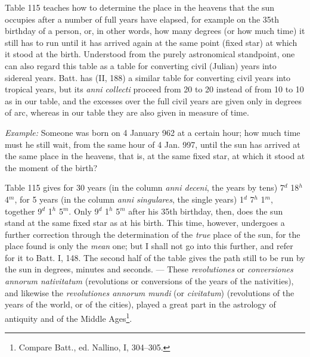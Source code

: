 \documentclass[11pt]{article}
\newcommand{\Pg}[1]{\marginpar{\footnotesize\color{gray}#1}}
\begin{document}
\par Table 115 teaches how to determine the place in the heavens that the sun occupies after a number of full years have elapsed, for example on the 35th birthday of a person, or, in other words, how many degrees (or how much time) it still has to run until it has arrived again at the same point (fixed star) at which it stood at the birth. Understood from the purely astronomical standpoint, one can also regard this table as a table for converting civil (Julian) years into sidereal years. Batt. has (II, 188) a similar table for converting civil years into tropical years, but its \emph{anni collecti} proceed from 20 to 20 instead of from 10 to 10 as in our table, and the excesses over the full civil years are given only in degrees of arc, whereas in our table they are also given in measure of time.\par
\par \emph{Example:} Someone was born on 4 January 962 at a certain hour; how much time must he still wait, from the same hour of 4 Jan. 997, until the sun has arrived at the same place in the heavens, that is, at the same fixed star, at which it stood at the moment of the birth?\par
\par \Pg{103}Table 115 gives for 30 years (in the column \emph{anni deceni}, the years by tens) 7$^{d}$ 18$^{h}$ 4$^{m}$, for 5 years (in the column \emph{anni singulares}, the single years) 1$^{d}$ 7$^{h}$ 1$^{m}$, together 9$^{d}$ 1$^{h}$ 5$^{m}$. Only 9$^{d}$ 1$^{h}$ 5$^{m}$ after his 35th birthday, then, does the sun stand at the same fixed star as at his birth. This time, however, undergoes a further correction through the determination of the \emph{true} place of the sun, for the place found is only the \emph{mean} one; but I shall not go into this further, and refer for it to Batt. I, 148. The second half of the table gives the path still to be run by the sun in degrees, minutes and seconds. — These \emph{revolutiones} or \emph{conversiones annorum nativitatum} (revolutions or conversions of the years of the nativities), and likewise the \emph{revolutiones annorum mundi} (or \emph{civitatum}) (revolutions of the years of the world, or of the cities), played a great part in the astrology of antiquity and of the Middle Ages\footnote{Compare Batt., ed. Nallino, I, 304–305.}.\par
\end{document}

